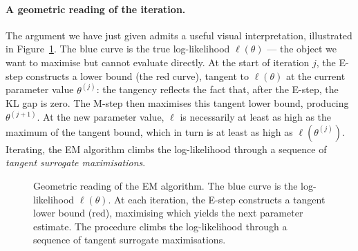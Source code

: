 \documentclass[11pt, a4paper, oneside]{article}
\begin{document}
\paragraph{A geometric reading of the iteration.}
The argument we have just given admits a useful visual interpretation,
illustrated in Figure~\ref{fig:em-iteration}. The blue curve is the
true log-likelihood $\ell(\theta)$ — the object we want to maximise
but cannot evaluate directly. At the start of iteration $j$, the
E-step constructs a lower bound (the red curve), tangent to
$\ell(\theta)$ at the current parameter value $\theta^{(j)}$: the
tangency reflects the fact that, after the E-step, the KL gap is
zero. The M-step then maximises this tangent lower bound, producing
$\theta^{(j+1)}$. At the new parameter value, $\ell$ is necessarily
at least as high as the maximum of the tangent bound, which in turn
is at least as high as $\ell(\theta^{(j)})$. Iterating, the EM
algorithm climbs the log-likelihood through a sequence of
\emph{tangent surrogate maximisations}.

\begin{figure}[h!]
\centering
{}
\caption{Geometric reading of the EM algorithm. The blue curve is the
log-likelihood $\ell(\theta)$. At each iteration, the E-step
constructs a tangent lower bound (red), maximising which yields the
next parameter estimate. The procedure climbs the log-likelihood
through a sequence of tangent surrogate maximisations.}
\label{fig:em-iteration}
\end{figure}
\end{document}
